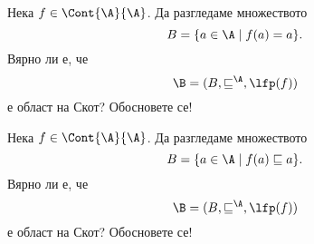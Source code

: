 
\begin{problem}%
  Нека $f \in \Cont{\A}{\A}$.
  Да разгледаме множеството 
  \[B = \{a \in \A \mid f(a) = a\}.\]
  Вярно ли е, че 
  \[\B = (B, \sqsubseteq^\A, \lfp(f))\] е област на Скот?
  Обосновете се!
\end{problem}

\begin{problem}%
  Нека $f \in \Cont{\A}{\A}$.
  Да разгледаме множеството 
  \[B = \{a \in \A \mid f(a) \sqsubseteq a\}.\]
  Вярно ли е, че 
  \[\B = (B, \sqsubseteq^\A, \lfp(f))\] е област на Скот?
  Обосновете се!
\end{problem}


